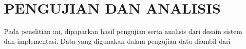 \chapter{PENGUJIAN DAN ANALISIS}
\label{chap:pengujiananalisis}

Pada penelitian ini, dipaparkan hasil pengujian serta analisis dari desain sistem dan implementasi.
Data yang digunakan dalam pengujian data diambil dari \textcolor{red}{\lipsum[1][1-5]}
